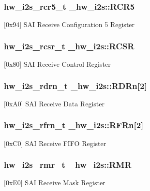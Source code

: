 \subsubsection[{\texorpdfstring{R\+C\+R5}{RCR5}}]{ {\bf hw\+\_\+i2s\+\_\+rcr5\+\_\+t} \+\_\+hw\+\_\+i2s\+::\+R\+C\+R5}\hypertarget{struct__hw__i2s_a45cf1dd0046366e8925714e7616f4984}{}\label{struct__hw__i2s_a45cf1dd0046366e8925714e7616f4984}
\mbox{[}0x94\mbox{]} S\+AI Receive Configuration 5 Register 
\subsubsection[{\texorpdfstring{R\+C\+SR}{RCSR}}]{ {\bf hw\+\_\+i2s\+\_\+rcsr\+\_\+t} \+\_\+hw\+\_\+i2s\+::\+R\+C\+SR}\hypertarget{struct__hw__i2s_a3676d079bbfe30e6f340ea20a452916c}{}\label{struct__hw__i2s_a3676d079bbfe30e6f340ea20a452916c}
\mbox{[}0x80\mbox{]} S\+AI Receive Control Register 
\subsubsection[{\texorpdfstring{R\+D\+Rn}{RDRn}}]{ {\bf hw\+\_\+i2s\+\_\+rdrn\+\_\+t} \+\_\+hw\+\_\+i2s\+::\+R\+D\+Rn\mbox{[}2\mbox{]}}\hypertarget{struct__hw__i2s_a5b6a61985bf252a88b3e02f92c5de5ae}{}\label{struct__hw__i2s_a5b6a61985bf252a88b3e02f92c5de5ae}
\mbox{[}0x\+A0\mbox{]} S\+AI Receive Data Register 
\subsubsection[{\texorpdfstring{R\+F\+Rn}{RFRn}}]{ {\bf hw\+\_\+i2s\+\_\+rfrn\+\_\+t} \+\_\+hw\+\_\+i2s\+::\+R\+F\+Rn\mbox{[}2\mbox{]}}\hypertarget{struct__hw__i2s_af6ab95e644b1397bfe879efe10e2aaf2}{}\label{struct__hw__i2s_af6ab95e644b1397bfe879efe10e2aaf2}
\mbox{[}0x\+C0\mbox{]} S\+AI Receive F\+I\+FO Register 
\subsubsection[{\texorpdfstring{R\+MR}{RMR}}]{ {\bf hw\+\_\+i2s\+\_\+rmr\+\_\+t} \+\_\+hw\+\_\+i2s\+::\+R\+MR}\hypertarget{struct__hw__i2s_a9ddcad17780e63698043f15a63eb60f6}{}\label{struct__hw__i2s_a9ddcad17780e63698043f15a63eb60f6}
\mbox{[}0x\+E0\mbox{]} S\+AI Receive Mask Register 
